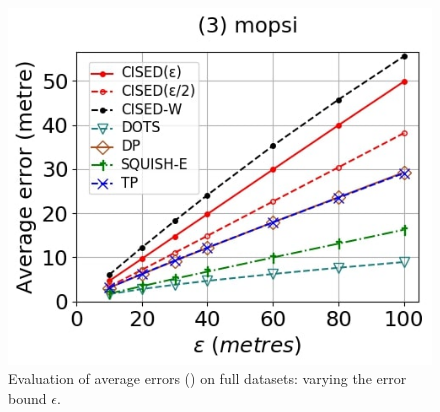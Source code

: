 \begin{figure}[tb!]
	\includegraphics[scale=0.250]{Figures/Exp-SED-error-epsilon-mopsi.jpg}		
	\vspace{-2ex}
	\caption{\small Evaluation of average errors (\sed) on full datasets: varying the error bound $\epsilon$.}
	\label{fig:ae-sed-epsilon}
	\vspace{-2ex}
\end{figure}
